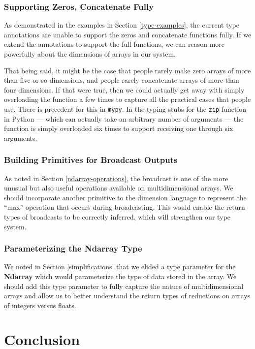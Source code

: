 \documentclass{report}
\begin{document}
\subsection{Supporting Zeros, Concatenate Fully}

As demonstrated in the examples in Section \ref{type-examples}, the current type annotations are unable to support the zeros and concatenate functions fully. If we extend the annotations to support the full functions, we can reason more powerfully about the dimensions of arrays in our system.

That being said, it might be the case that people rarely make zero arrays of more than five or so dimensions, and people rarely concatenate arrays of more than four dimensions. If that were true, then we could actually get away with simply overloading the function a few times to capture all the practical cases that people use. There is precedent for this in \texttt{mypy}. In the typing stubs for the \texttt{zip} function in Python --- which can actually take an arbitrary number of arguments --- the function is simply overloaded six times to support receiving one through six arguments.

\subsection{Building Primitives for Broadcast Outputs}

As noted in Section \ref{ndarray-operations}, the broadcast is one of the more unusual but also useful operations available on multidimensional arrays. We should incorporate another primitive to the dimension language to represent the ``max'' operation that occurs during broadcasting. This would enable the return types of broadcasts to be correctly inferred, which will strengthen our type system.

\subsection{Parameterizing the Ndarray Type}

We noted in Section \ref{simplifications} that we elided a type parameter for the \textbf{Ndarray} which would parameterize the type of data stored in the array. We should add this type parameter to fully capture the nature of multidimensional arrays and allow us to better understand the return types of reductions on arrays of integers versus floats.

\chapter{Conclusion}
\end{document}
